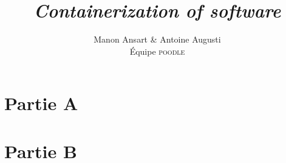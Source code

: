 \documentclass[a4paper, 12pt, french, titlepage]{scrartcl}
\title{\textit{Containerization of software}}
\author{Manon Ansart \& Antoine Augusti\\Équipe \textsc{poodle}}
\date{}
\begin{document}
    \maketitle

    \section*{Partie A}
        

    \section*{Partie B}
        
\end{document}
